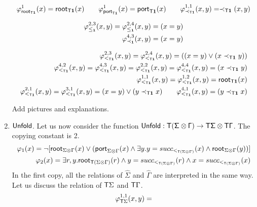 \begin{pr}
\begin{enumerate}
\begin{align*}
\varphi^1_{\mathsf{root}_{\mathsf T\mathbf{1}}}(x)=\mathsf{root}_{\mathsf T\mathbf{1}}(x) \qquad \varphi^1_{\mathsf{port}_{\mathsf T\mathbf{1}}}(x)=\mathsf{port}_{\mathsf T\mathbf{1}}(x)
\qquad\varphi^{1,1}_{\prec_{\mathsf T\mathbf{1}}}(x,y)=\prec_{\mathsf T\mathbf{1}}(x,y) 
\end{align*}

\begin{align*}
\varphi^{2,3}_{\leq_{\mathbf{1}}}(x,y) = \varphi^{2,4}_{\leq_{\mathbf{1}}}(x,y) = (x=y)\\
\varphi^{4,3}_{\prec_{\mathbf{1}}}(x,y) =(x=y)
\end{align*}

\begin{align*}
\varphi^{2,3}_{<_{\mathsf T\mathbf{1}}}(x,y)= \varphi^{2,4}_{<_{\mathsf T\mathbf{1}}}(x,y)= ((x=y) \vee (x\prec_{\mathsf T\mathbf{1}} y))\\
\varphi^{4,2}_{<_{\mathsf T\mathbf{1}}}(x,y)=\varphi^{4,3}_{<_{\mathsf T\mathbf{1}}}(x,y)=\varphi^{2,2}_{<_{\mathsf T\mathbf{1}}}(x,y)= \varphi^{4,4}_{<_{\mathsf T\mathbf{1}}}(x,y)= (x\prec_{\mathsf T\mathbf{1}} y)\\
\varphi^{1,1}_{<_{\mathsf T\mathbf{1}}}(x,y)=\varphi^{1,2}_{<_{\mathsf T\mathbf{1}}}(x,y)= \mathsf{root}_{\mathsf T\mathbf{1}}(x)\\
\varphi^{2,1}_{<_{\mathsf T\mathbf{1}}}(x,y)=\varphi^{3,1}_{<_{\mathsf T\mathbf{1}}}(x,y)=(x=y) \vee (y\prec_{\mathsf T\mathbf{1}} x)\qquad 
\varphi^{4,1}_{<_{\mathsf T\mathbf{1}}}(x,y)=(y\prec_{\mathsf T\mathbf{1}} x)
\end{align*}
\begin{center}
Add pictures and explanations.
\end{center}
\item $\sf{Unfold}$. Let us now consider the function $\sf{Unfold}:\mathsf T(\Sigma\otimes \Gamma)\to \mathsf T\Sigma\otimes\mathsf T\Gamma$. The copying constant is 2. 
\begin{align*}
\varphi_1(x)=\neg [\mathsf{root}_{\Sigma\otimes\Gamma}(x)\vee (\mathsf{port}_{\Sigma\otimes\Gamma}(x)\wedge \exists y. y=succ_{<_{\mathsf T(\Sigma\otimes\Gamma)}}(x) \wedge \mathsf{root}_{\Sigma\otimes\Gamma}(y))]\\
\varphi_2(x)=\exists r, y. \mathsf{root}_{\mathsf T(\Sigma\otimes\Gamma)}(r) \wedge y=succ_{<_{\mathsf T(\Sigma\otimes\Gamma)}}(r) \wedge x= succ_{<_{\mathsf T(\Sigma\otimes\Gamma)}}(x) 
\end{align*}
In the first copy, all the relations of $\widehat{\Sigma}$ and $\widehat{\Gamma}$ are interpreted in the same way. 
Let us discuss the relation of $\mathsf T\Sigma$ and $\mathsf T\Gamma$.
\[\varphi^{1,1}_{\mathsf T\Sigma}(x,y)=\] 
\end{enumerate} 

 \end{pr}